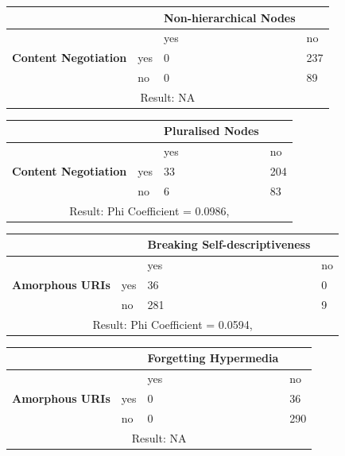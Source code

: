 \documentclass[a4paper,12pt]{article}
\begin{document}
\begin{center}
  \begin{tabular}{| p{60mm} | p{10mm} | p{35mm} | p{35mm} |}
  \hline
   & & \textbf{Non-hierarchical Nodes} &
  \\
  \hline
  & & yes & no
  \\
  \hline
  \textbf{Content Negotiation} & yes & 0 & 237
  \\
  \hline
   & no & 0 & 89
  \\
  \hline
  \multicolumn{4}{|c|}{Result: NA}
  \\ \hline
  \end{tabular}
  \end{center}

\begin{center}
  \begin{tabular}{| p{60mm} | p{10mm} | p{35mm} | p{35mm} |}
  \hline
   & & \textbf{Pluralised Nodes} &
  \\
  \hline
  & & yes & no
  \\
  \hline
  \textbf{Content Negotiation} & yes & 33 & 204
  \\
  \hline
   & no & 6 & 83
  \\
  \hline
  \multicolumn{4}{|c|}{Result: Phi Coefficient = 0.0986, }
  \\ \hline
  \end{tabular}
  \end{center}

\begin{center}
  \begin{tabular}{| p{60mm} | p{10mm} | p{35mm} | p{35mm} |}
  \hline
   & & \textbf{Breaking Self-descriptiveness} &
  \\
  \hline
  & & yes & no
  \\
  \hline
  \textbf{Amorphous URIs} & yes & 36 & 0
  \\
  \hline
   & no & 281 & 9
  \\
  \hline
  \multicolumn{4}{|c|}{Result: Phi Coefficient = 0.0594, }
  \\ \hline
  \end{tabular}
  \end{center}

\begin{center}
  \begin{tabular}{| p{60mm} | p{10mm} | p{35mm} | p{35mm} |}
  \hline
   & & \textbf{Forgetting Hypermedia} &
  \\
  \hline
  & & yes & no
  \\
  \hline
  \textbf{Amorphous URIs} & yes & 0 & 36
  \\
  \hline
   & no & 0 & 290
  \\
  \hline
  \multicolumn{4}{|c|}{Result: NA}
  \\ \hline
  \end{tabular}
  \end{center}
\end{document}
